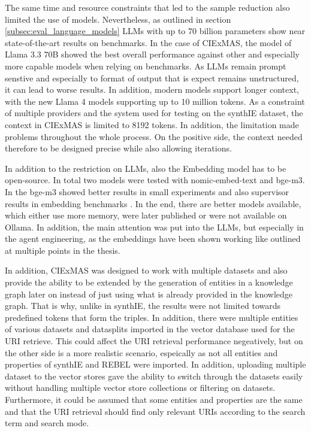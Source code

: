 \documentclass[a4paper,oneside,bibliography=totoc]{scrbook}
\begin{document}
The same time and resource constraints that led to the sample reduction also limited the use of models. Nevertheless, as outlined in section \ref{subsec:eval_language_models} \acp{LLM} with up to 70 billion parameters show near state-of-the-art results on benchmarks. In the case of CIExMAS, the model of Llama 3.3 70B showed the best overall performance against other and especially more capable models when relying on benchmarks. As \acp{LLM} remain prompt senstive and especially to format of output that is expect remains unstructured, it can lead to worse results. In addition, modern models support longer context, with the new Llama 4 models supporting up to 10 million tokens. As a constraint of multiple providers and the system used for testing on the synthIE dataset, the context in CIExMAS is limited to 8192 tokens. In addition, the limitation made problems throughout the whole process. On the positive side, the context needed therefore to be designed precise while also allowing iterations.

In addition to the restriction on \acp{LLM}, also the Embedding model has to be open-source. In total two models were tested with nomic-embed-text and bge-m3. In the bge-m3 showed better results in small experiments and also supervisor results in embedding benchmarks \cite{Muennighoff2023}. In the end, there are better models available, which either use more memory, were later published or were not available on Ollama. In addition, the main attention was put into the \acp{LLM}, but especially in the agent engineering, as the embeddings have been shown working like outlined at multiple points in the thesis.

In addition, CIExMAS was designed to work with multiple datasets and also provide the ability to be extended by the generation of entities in a knowledge graph later on instead of just using what is already provided in the knowledge graph. That is why, unlike in synthIE, the results were not limited towards predefined tokens that form the triples. In addition, there were multiple entities of various datasets and datasplits imported in the vector database used for the URI retrieve. This could affect the URI retrieval performance negeatively, but on the other side is a more realistic scenario, espeically as not all entities and properties of synthIE and REBEL were imported. In addition, uploading multiple dataset to the vector stores gave the ability to switch through the datasets easily without handling multiple vector store collections or filtering on datasets. Furthermore, it could be assumed that some entities and properties are the same and that the URI retrieval should find only relevant URIs according to the search term and search mode.
\end{document}
